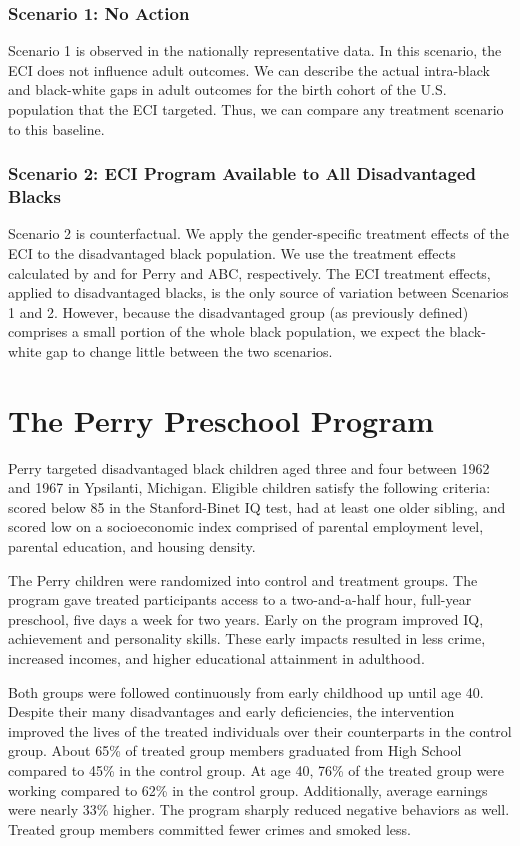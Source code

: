 \subsubsection*{Scenario 1: No Action}
Scenario 1 is observed in the nationally representative data. In this scenario, the ECI does not influence adult outcomes. We can describe the actual intra-black and black-white gaps in adult outcomes for the birth cohort of the U.S. population that the ECI targeted. Thus, we can compare any treatment scenario to this baseline.

\subsubsection*{Scenario 2: ECI Program Available to All Disadvantaged Blacks}
Scenario 2 is counterfactual. We apply the gender-specific treatment effects of the ECI to the disadvantaged black population. We use the treatment effects calculated by \citet{heckman2010analyzing} and \citet{Frances_2013_EJ} for Perry and ABC, respectively. The ECI treatment effects, applied to disadvantaged blacks, is the only source of variation between Scenarios 1 and 2. However, because the disadvantaged group (as previously defined) comprises a small portion of the whole black population, we expect the black-white gap to change little between the two scenarios.

\section{The Perry Preschool Program} \label{sec:Perry}
Perry targeted disadvantaged black children aged three and four between 1962 and 1967 in Ypsilanti, Michigan. Eligible children satisfy the following criteria: scored below 85 in the Stanford-Binet IQ test, had at least one older sibling, and scored low on a socioeconomic index comprised of parental employment level, parental education, and housing density.

The Perry children were randomized into control and treatment groups. The program gave treated participants access to a two-and-a-half hour, full-year preschool, five days a week for two years. Early on the program improved IQ, achievement and personality skills. These early impacts resulted in less crime, increased incomes, and higher educational attainment in adulthood.

Both groups were followed continuously from early childhood up until age 40. Despite their many disadvantages and early deficiencies, the intervention improved the lives of the treated individuals over their counterparts in the control group. About 65\% of treated group members graduated from High School compared to 45\% in the control group. At age 40, 76\% of the treated group were working compared to 62\% in the control group. Additionally, average earnings were nearly 33\% higher. The program sharply reduced negative behaviors as well. Treated group members committed fewer crimes and smoked less. 


